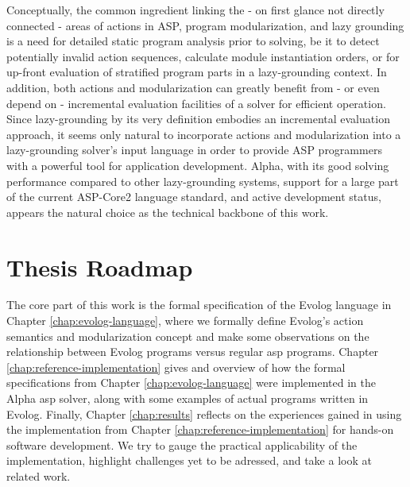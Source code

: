 Conceptually, the common ingredient linking the - on first glance not directly connected - areas of actions in ASP, program modularization, and lazy grounding is a need for detailed static program analysis prior to solving, be it to detect potentially invalid action sequences, calculate module instantiation orders, or for up-front evaluation of stratified program parts in a lazy-grounding context. In addition, both actions and modularization can greatly benefit from - or even depend on - incremental evaluation facilities of a solver for efficient operation. Since lazy-grounding by its very definition embodies an incremental evaluation approach, it seems only natural to incorporate actions and modularization into a lazy-grounding solver's input language in order to provide ASP programmers with a powerful tool for application development. Alpha, with its good solving performance compared to other lazy-grounding systems, support for a large part of the current ASP-Core2 language standard, and active development status, appears the natural choice as the technical backbone of this work.

\section{Thesis Roadmap}
\label{sec:thesis-roadmap}

The core part of this work is the formal specification of the Evolog language in Chapter \ref{chap:evolog-language}, where we formally define Evolog's action semantics and modularization concept and make some observations on the relationship between Evolog programs versus regular \gls{asp} programs. Chapter \ref{chap:reference-implementation} gives and overview of how the formal specifications from Chapter \ref{chap:evolog-language} were implemented in the Alpha \gls{asp} solver, along with some examples of actual programs written in Evolog. Finally, Chapter \ref{chap:results} reflects on the experiences gained in using the implementation from Chapter \ref{chap:reference-implementation} for hands-on software development. We try to gauge the practical applicability of the implementation, highlight challenges yet to be adressed, and take a look at related work.